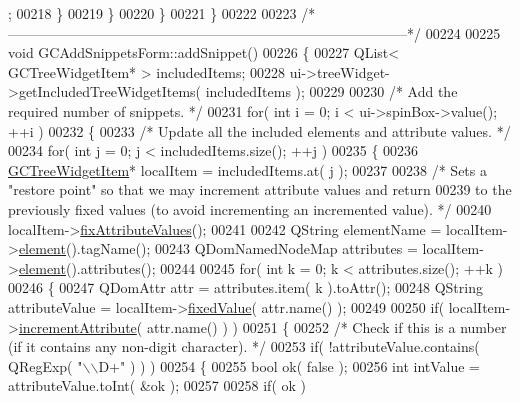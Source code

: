 \begin{DoxyCode}
      ;
00218       \}
00219     \}
00220   \}
00221 \}
00222 
00223 \textcolor{comment}{/*
      --------------------------------------------------------------------------------------*/}
00224 
00225 \textcolor{keywordtype}{void} GCAddSnippetsForm::addSnippet()
00226 \{
00227   QList< GCTreeWidgetItem* > includedItems;
00228   ui->treeWidget->getIncludedTreeWidgetItems( includedItems );
00229 
00230   \textcolor{comment}{/* Add the required number of snippets. */}
00231   \textcolor{keywordflow}{for}( \textcolor{keywordtype}{int} i = 0; i < ui->spinBox->value(); ++i )
00232   \{
00233     \textcolor{comment}{/* Update all the included elements and attribute values. */}
00234     \textcolor{keywordflow}{for}( \textcolor{keywordtype}{int} j = 0; j < includedItems.size(); ++j )
00235     \{
00236       \hyperlink{class_g_c_tree_widget_item}{GCTreeWidgetItem}* localItem = includedItems.at( j );
00237 
00238       \textcolor{comment}{/* Sets a "restore point" so that we may increment attribute values and
       return}
00239 \textcolor{comment}{        to the previously fixed values (to avoid incrementing an incremented
       value). */}
00240       localItem->\hyperlink{class_g_c_tree_widget_item_ada99ae07bebffd9714be294cdd3d920b}{fixAttributeValues}();
00241 
00242       QString elementName = localItem->\hyperlink{class_g_c_tree_widget_item_a584cad866bdbd94710d31eb77b804d84}{element}().tagName();
00243       QDomNamedNodeMap attributes = localItem->\hyperlink{class_g_c_tree_widget_item_a584cad866bdbd94710d31eb77b804d84}{element}().attributes();
00244 
00245       \textcolor{keywordflow}{for}( \textcolor{keywordtype}{int} k = 0; k < attributes.size(); ++k )
00246       \{
00247         QDomAttr attr = attributes.item( k ).toAttr();
00248         QString attributeValue = localItem->\hyperlink{class_g_c_tree_widget_item_a62a31fad1e50915f6df144e23394abef}{fixedValue}( attr.name() );
00249 
00250         \textcolor{keywordflow}{if}( localItem->\hyperlink{class_g_c_tree_widget_item_af0b5f0f5449f402c90e5ab7ff74acc77}{incrementAttribute}( attr.name() ) )
00251         \{
00252           \textcolor{comment}{/* Check if this is a number (if it contains any non-digit
       character). */}
00253           \textcolor{keywordflow}{if}( !attributeValue.contains( QRegExp( \textcolor{stringliteral}{"\(\backslash\)\(\backslash\)D+"} ) ) )
00254           \{
00255             \textcolor{keywordtype}{bool} ok( \textcolor{keyword}{false} );
00256             \textcolor{keywordtype}{int} intValue = attributeValue.toInt( &ok );
00257 
00258             \textcolor{keywordflow}{if}( ok )

\end{DoxyCode}
